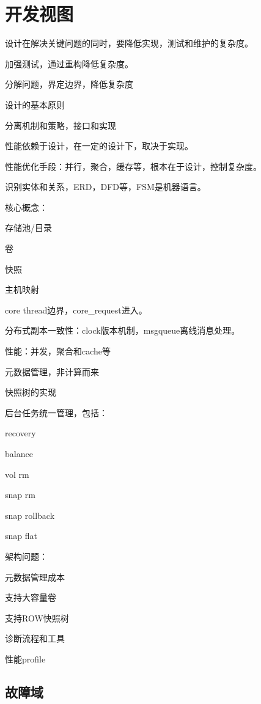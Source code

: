 \chapter{开发视图}

设计在解决关键问题的同时，要降低实现，测试和维护的复杂度。

加强测试，通过重构降低复杂度。

分解问题，界定边界，降低复杂度

设计的基本原则

分离机制和策略，接口和实现

性能依赖于设计，在一定的设计下，取决于实现。

性能优化手段：并行，聚合，缓存等，根本在于设计，控制复杂度。

识别实体和关系，ERD，DFD等，FSM是机器语言。

核心概念：
\begin{compactenum}
\item 存储池/目录
\item 卷
\item 快照
\item 主机映射
\end{compactenum}

core thread边界，core\_request进入。

分布式副本一致性：clock版本机制，msgqueue离线消息处理。

性能：并发，聚合和cache等

元数据管理，非计算而来

快照树的实现

后台任务统一管理，包括：
\begin{compactenum}
\item recovery
\item balance
\item vol rm
\item snap rm
\item snap rollback
\item snap flat
\end{compactenum}

架构问题：
\begin{compactenum}
\item 元数据管理成本
\item 支持大容量卷
\item 支持ROW快照树
\item 诊断流程和工具
\item 性能profile
\end{compactenum}

\section{故障域}

